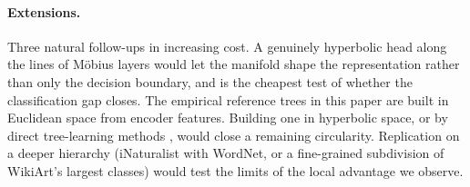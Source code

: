 \paragraph{Extensions.} Three natural follow-ups in increasing cost.
A genuinely hyperbolic head along the lines of M\"obius layers
\citep{ganea2018hyperbolic} would let the manifold shape the
representation rather than only the decision boundary, and is the
cheapest test of whether the classification gap closes. The
empirical reference trees in this paper are built in Euclidean space
from encoder features. Building one in hyperbolic space, or by direct
tree-learning methods \citep{chami2020trees}, would close a
remaining circularity. Replication on a deeper hierarchy
(iNaturalist with WordNet, or a fine-grained subdivision of
WikiArt's largest classes) would test the limits of the local
advantage we observe.

